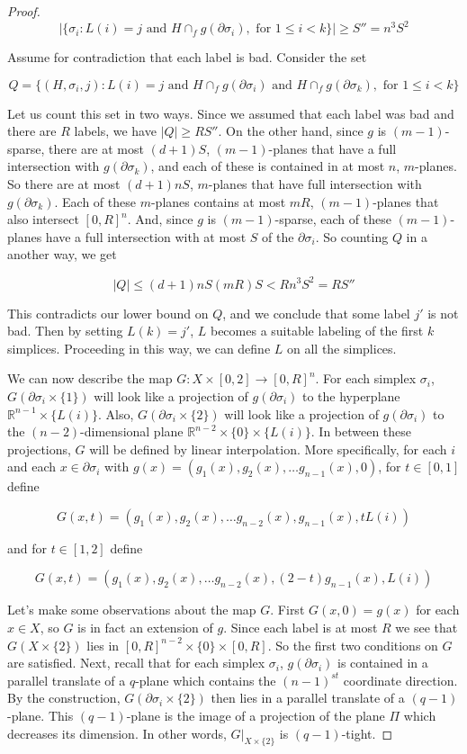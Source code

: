 \documentclass[12pt]{article}
\newcommand{\RR}{\mathbb{R}}
\begin{document}
\begin{proof}
		$$|\{\sigma_i: L(i) = j \text{ and } H \cap_f g(\partial \sigma_i), \text{ for } 1 \le i < k\}| \ge S''=n^3S^2$$
		
		\noindent Assume for contradiction that each label is bad. Consider the set
		
		$$Q = \{(H, \sigma_i, j):  L(i) = j \text{ and } H \cap_f g(\partial \sigma_i)  \text{ and } H \cap_f g(\partial \sigma_k), \text{ for } 1 \le i < k\}$$
		
		Let us count this set in two ways. Since we assumed that each label was bad and there are $R$ labels, we have $|Q| \ge RS''$. On the other hand, since $g$ is $(m-1)$-sparse, there are at most $(d+1)S$, $(m-1)$-planes that have a full intersection with $g(\partial \sigma_k)$, and each of these is contained in at most $n$, $m$-planes. So there are at most $(d+1)nS$, $m$-planes that have full intersection with $g(\partial \sigma_k)$. Each of these $m$-planes contains at most $mR$, $(m-1)$-planes that also intersect $[0,R]^n$. And, since $g$ is $(m-1)$-sparse, each of these $(m-1)$-planes have a full intersection with at most $S$ of the $\partial \sigma_i$. So counting $Q$ in a another way, we get 
		
		$$|Q| \le (d+1)nS(mR)S < Rn^3S^2 = RS''$$ 
		
		This contradicts our lower bound on $Q$, and we conclude that some label $j'$ is not bad. Then by setting $L(k)= j'$, $L$ becomes a suitable labeling of the first $k$ simplices. Proceeding in this way, we can define $L$ on all the simplices.
		
		We can now describe the map $G: X \times [0,2] \to [0,R]^n$. For each simplex $\sigma_i$, $G(\partial \sigma_i \times \{1\})$ will look like a projection of $g(\partial \sigma_i)$ to the hyperplane $\RR^{n-1} \times \{L(i)\}$. Also, $G(\partial \sigma_i \times \{2\})$ will look like a projection of $g(\partial \sigma_i)$ to the $(n-2)$-dimensional plane $\RR^{n-2} \times \{0\} \times \{L(i)\}$. In between these projections, $G$ will be defined by linear interpolation. More specifically, for each $i$ and each $x \in \partial \sigma_i$ with $g(x) = (g_1(x), g_2(x), \ldots g_{n-1}(x), 0)$, for $t \in [0,1]$ define
		
		$$G(x, t) = (g_1(x), g_2(x), \ldots g_{n-2}(x), g_{n-1}(x), tL(i))$$
		
		\noindent and for $t \in [1,2]$ define
		
		$$G(x, t) = (g_1(x), g_2(x), \ldots g_{n-2}(x), (2-t)g_{n-1}(x), L(i))$$
		
		Let's make some observations about the map $G$. First $G(x,0) = g(x)$ for each $x \in X$, so $G$ is in fact an extension of $g$. Since each label is at most $R$ we see that $G(X \times \{2\})$ lies in $[0,R]^{n-2} \times \{0\} \times [0,R]$. So the first two conditions on $G$ are satisfied. Next, recall that for each simplex $\sigma_i$, $g(\partial \sigma_i)$ is contained in a parallel translate of a $q$-plane which contains the $(n-1)^{st}$ coordinate direction. By the construction, $G(\partial \sigma_i \times \{2\})$ then lies in a parallel translate of a $(q-1)$-plane. This $(q-1)$-plane is the image of a projection of the plane $\Pi$ which decreases its dimension. In other words, $G|_{X \times \{2\}}$ is $(q-1)$-tight.
		

\end{proof}
\end{document}
